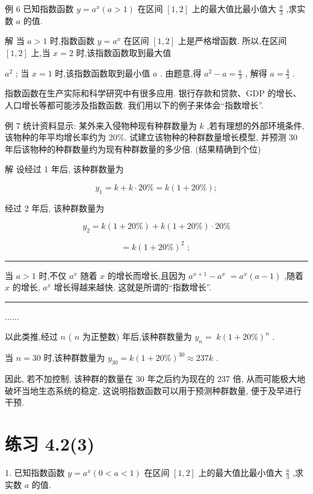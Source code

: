 \documentclass[10pt]{article}
\newcommand{\HRule}{\begin{center}\rule{0.9\linewidth}{0.2mm}\end{center}}
\begin{document}
例 6 已知指数函数 \(y = {a}^{x}\left( {a > 1}\right)\) 在区间 \(\left\lbrack  {1,2}\right\rbrack\) 上的最大值比最小值大 \(\frac{a}{3}\) ,求实数 \(a\) 的值.

解 当 \(a > 1\) 时,指数函数 \(y = {a}^{x}\) 在区间 \(\left\lbrack  {1,2}\right\rbrack\) 上是严格增函数. 所以,在区间 \(\left\lbrack  {1,2}\right\rbrack\) 上,当 \(x = 2\) 时,该指数函数取到最大值

 \({a}^{2}\) ; 当 \(x = 1\) 时,该指数函数取到最小值 \(a\) . 由题意,得 \({a}^{2} - a = \frac{a}{3}\) , 解得 \(a = \frac{4}{3}\) .

指数函数在生产实际和科学研究中有很多应用. 银行存款和贷款、GDP 的增长、人口增长等都可能涉及指数函数. 我们用以下的例子来体会“指数增长”.

例 7 统计资料显示: 某外来入侵物种现有种群数量为 \(k\) ,若有理想的外部环境条件,该物种的年平均增长率约为 20\%. 试建立该物种的种群数量增长模型, 并预测 30 年后该物种的种群数量约为现有种群数量的多少倍. (结果精确到个位)

解 设经过 1 年后, 该种群数量为

\[
{y}_{1} = k + k \cdot  {20}\%  = k\left( {1 + {20}\% }\right) ;
\]

经过 2 年后, 该种群数量为

\[
{y}_{2} = k\left( {1 + {20}\% }\right)  + k\left( {1 + {20}\% }\right)  \cdot  {20}\%
\]

\[
= k{\left( 1 + {20}\% \right) }^{2}\text{ ; }
\]

\HRule

当 \(a > 1\) 时,不仅 \({a}^{x}\) 随着 \(x\) 的增长而增长,且因为 \({a}^{x + 1} - {a}^{x} \; = {a}^{x}\left( {a - 1}\right)\) ,随着 \(x\) 的增长, \({a}^{x}\) 增长得越来越快. 这就是所谓的“指数增长”.

\HRule

......

以此类推,经过 \(n\) ( \(n\) 为正整数) 年后,该种群数量为 \({y}_{n} = \; k{\left( 1 + {20}\% \right) }^{n}\) .

当 \(n = {30}\) 时,该种群数量为 \({y}_{30} = k{\left( 1 + {20}\% \right) }^{30} \approx  {237k}\) .

因此, 若不加控制, 该种群的数量在 30 年之后约为现在的 237 倍, 从而可能极大地破坏当地生态系统的稳定, 这说明指数函数可以用于预测种群数量, 便于及早进行干预.

\section*{练习 4.2(3)}

1. 已知指数函数 \(y = {a}^{x}\left( {0 < a < 1}\right)\) 在区间 \(\left\lbrack  {1,2}\right\rbrack\) 上的最大值比最小值大 \(\frac{a}{3}\) ,求实数 \(a\) 的值.
\end{document}
